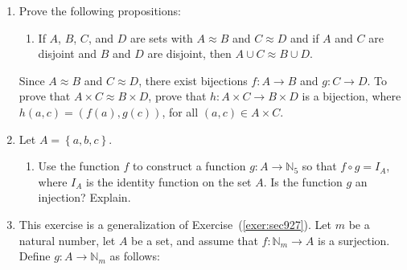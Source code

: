 \begin{enumerate}
\item Prove the following propositions: 
\label{exer:sec92-7}%
\begin{enumerate}
\yitem If $A$, $B$, $C$, and $D$ are sets with $A \approx B$ and $C \approx D$,  then \linebreak
$A \times C \approx B \times D$. 
\label{exer:equivcartesian}%

\item If $A$, $B$, $C$, and $D$ are sets with $A \approx B$ and $C \approx D$ and if $A$ and $C$ are disjoint and $B$ and $D$ are disjoint, then $A \cup C \approx B \cup D$. 
\label{exer:equivunion}%
\end{enumerate}

\hint Since $A \approx B$ and $C \approx D$, there exist bijections $f:A \to B$ and $g:C \to D$.  To prove that $A \times C \approx B \times D$, prove that 
$h:A \times C \to B \times D$ is a bijection, where 
$h ( a, c ) = \left( f ( a ), g ( c ) \right)$, 
for all $( a, c ) \in A \times C$.


\item Let  $A = \left\{ a, b, c \right\}$. 
\label{exer:sec927}%
\begin{enumerate}
\yitem Construct a function $f:\mathbb{N}_5 \to A$ such that $f$ is a surjection.

\item Use the function $f$ to construct a function $g:A \to \mathbb{N}_5$ so that \linebreak
$f \circ g = I_A$, where $I_A$ is the identity function on the set $A$.  Is the function $g$ an injection?  Explain.
\end{enumerate}

\item This exercise is a generalization of Exercise~(\ref{exer:sec927}). Let $m$ be a natural number, let $A$ be a set, and assume that $f:\mathbb{N}_m \to A$ is a surjection.  Define \linebreak
$g:A \to \mathbb{N}_m$ as follows: 
\label{exer:sec928}%


\end{enumerate}
